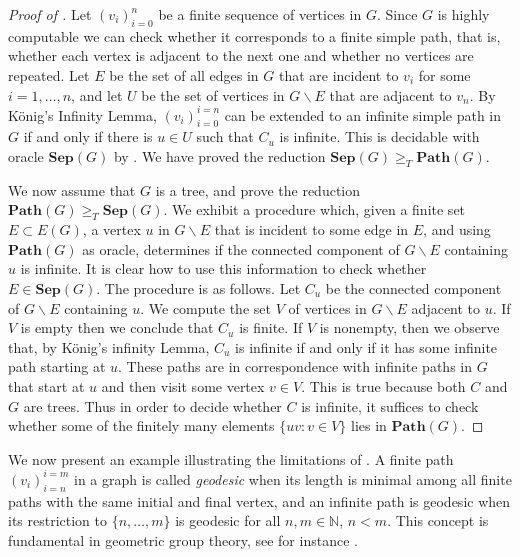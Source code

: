 \documentclass[10pt,A4]{amsart}
\theoremstyle{definition}
\theoremstyle{definition}
\newcommand{\N}{\mathbb{N}}
\newcommand{\sep}[1]{\mathbf{Sep}({#1})}
\newcommand{\Path}[1]{\mathbf{Path}({#1})}
\renewcommand{\mid}{ : }
\newcommand{\G}{G}
\begin{document}
\begin{proof}[Proof of ]
Let $(v_i)_{i=0}^{n}$ be a finite sequence of vertices in $G$. Since $G$ is highly computable we can check whether it corresponds to a finite simple path, that is, whether each vertex is adjacent to the next one and whether no vertices are repeated. Let $E$ be the set of all edges in $G$ that are incident to $v_i$ for some $i=1,\dots,n$, and let $U$ be the set of vertices in $G\smallsetminus E$ that are adjacent to $v_n$. By König's Infinity Lemma, $(v_i)_{i=0}^{i=n}$ can be extended to an infinite simple path in $G$ if and only if there is $u\in U$ such that $C_u$ is infinite. This is decidable with oracle $\sep{G}$ by . We have proved  the reduction $\sep{G}\geq_{T}\Path{G}$. 

We now assume that $\G$ is a tree, and prove the reduction $\Path{G}\geq_{T}\sep{G}$.
We exhibit a procedure which, given a finite set $E\subset E(\G)$, a
vertex $u$ in $\G\smallsetminus E$ that is incident to some edge
in $E$, and using $\Path{G}$ as oracle, determines if the connected
component of $\G\smallsetminus E$ containing $u$ is infinite. It
is clear how to use this information to check whether $E\in\sep{G}$. The procedure is as follows. Let $C_u$ be the connected component of $\G\smallsetminus E$ containing $u$. We compute the
set $V$ of vertices in  $\G\smallsetminus E$ adjacent to $u$. 
If $V$ is
empty then we conclude that $C_u$ is  finite. If $V$ is
nonempty, then we observe that, by König's infinity Lemma, $C_u$
is infinite if and only if it has some infinite path starting at $u$. These paths are in correspondence
with infinite paths in $\G$ that start at $u$ and then visit
some vertex $v\in V$. This is true because both $C$ and $\G$ are trees. Thus in order to decide whether
$C$ is infinite, it suffices to check whether some of the finitely
many elements $\{uv\mid v\in V\}$ lies in $\Path{G}$. 
\end{proof}

We now present an example illustrating the limitations of . A finite path $(v_i)_{i=n}^{i=m}$ in a graph is called \textit{geodesic} when its length is minimal among all finite paths with the same initial and final vertex, and an infinite path is geodesic when its restriction to $\{n,\dots,m\}$ is geodesic for all $n,m\in\N$, $n<m$. This concept is fundamental in geometric group theory, see for instance \cite[Chapter 11]{drutu_geometric_2018}. 
\end{document}
